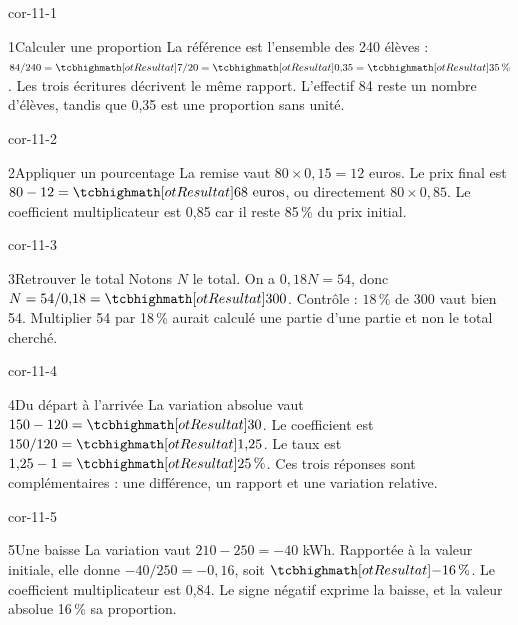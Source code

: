 \clearpage\pagestyle{otMain}\fontsize{11}{15}\selectfont
{}
\begin{blocLivre}{cor-11-1}
\begin{corrige}{1}{Calculer une proportion}
La référence est l’ensemble des 240 élèves : $84/240=\res{7/20}=\res{0{,}35}=\res{35\,\%}$. Les trois écritures décrivent le même rapport. L’effectif 84 reste un nombre d’élèves, tandis que 0,35 est une proportion sans unité.
\end{corrige}
\end{blocLivre}
\begin{blocLivre}{cor-11-2}
\begin{corrige}{2}{Appliquer un pourcentage}
La remise vaut $80\times0{,}15=12$ euros. Le prix final est $80-12=\res{68\text{ euros}}$, ou directement $80\times0{,}85$. Le coefficient multiplicateur est 0,85 car il reste 85\,\% du prix initial.
\end{corrige}
\end{blocLivre}
\begin{blocLivre}{cor-11-3}
\begin{corrige}{3}{Retrouver le total}
Notons $N$ le total. On a $0{,}18N=54$, donc $N=54/0{,}18=\res{300}$. Contrôle : $18\,\%$ de 300 vaut bien 54. Multiplier 54 par 18\,\% aurait calculé une partie d’une partie et non le total cherché.
\end{corrige}
\end{blocLivre}
\begin{blocLivre}{cor-11-4}
\begin{corrige}{4}{Du départ à l’arrivée}
La variation absolue vaut $150-120=\res{30}$. Le coefficient est $150/120=\res{1{,}25}$. Le taux est $1{,}25-1=\res{25\,\%}$. Ces trois réponses sont complémentaires : une différence, un rapport et une variation relative.
\end{corrige}
\end{blocLivre}
\begin{blocLivre}{cor-11-5}
\begin{corrige}{5}{Une baisse}
La variation vaut $210-250=-40$ kWh. Rapportée à la valeur initiale, elle donne $-40/250=-0{,}16$, soit $\res{-16\,\%}$. Le coefficient multiplicateur est 0,84. Le signe négatif exprime la baisse, et la valeur absolue 16\,\% sa proportion.
\end{corrige}
\end{blocLivre}
